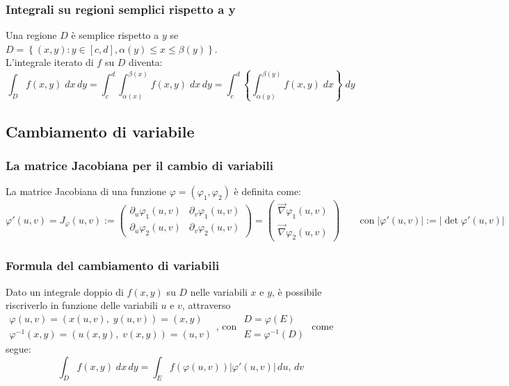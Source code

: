 \documentclass[a4paper]{article}
\newcommand\nab{\vec{\nabla}} %
\begin{document}
\subsubsection*{Integrali su regioni semplici rispetto a y}
Una regione \(D\) è semplice rispetto a \(y\) se \(D = \left\{ (x,y) : y \in [c,d], \alpha(y) \leq x \leq \beta(y) \right\}\). \\
L'integrale iterato di \(f\) su \(D\) diventa:
\[\int_D f(x,y) \; dx \, dy = \int_c^d \int_{\alpha(x)}^{\beta(x)} f(x,y) \; dx \, dy = \int_c^d \left\{\int_{\alpha(y)}^{\beta(y)} f(x,y) \; dx\right\} \; dy\]

\subsection{Cambiamento di variabile}
\subsubsection*{La matrice Jacobiana per il cambio di variabili}
La matrice Jacobiana di una funzione \(\varphi = (\varphi_1, \varphi_2)\) è definita come:
\[\varphi'(u,v) = J_{\varphi} (u,v) := \left( \begin{matrix}
	\partial_u \varphi_1 (u,v) & \partial_v \varphi_1 (u,v) \\
	\partial_u \varphi_2 (u,v) & \partial_v \varphi_2 (u,v)
\end{matrix} \right) = \left( \begin{matrix}
	\nab \varphi_1 (u,v) \\
	\nab \varphi_2 (u,v)
\end{matrix} \right) \qquad \text{con} \; \left| \varphi'(u,v) \right| := \left| \det \varphi' (u,v)\right|\]

\subsubsection*{Formula del cambiamento di variabili}
Dato un integrale doppio di \(f(x,y)\) su \(D\) nelle variabili \(x\) e \(y\), è possibile riscriverlo in funzione delle variabili
\(u\) e \(v\), attraverso \(\begin{matrix}
	\varphi (u,v) = (x(u,v), \; y(u,v)) = (x,y) \\[2pt]
	\varphi^{-1} (x,y) = (u(x,y), \; v(x,y)) = (u,v)
\end{matrix}\), con \(\begin{matrix}
	D = \varphi(E) \\[2pt]
	E = \varphi^{-1}(D)
\end{matrix}\) come segue:
\[\int_D f(x,y) \; dx \, dy = \int_E f(\varphi(u,v)) \left| \varphi'(u,v) \right| \, du, \, dv\]
\end{document}
